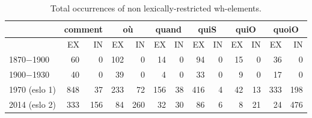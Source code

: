 \documentclass[fleqn,10pt]{wlscirep}
\begin{document}
\begin{table}[H]
    \centering
    \small
    \begin{adjustbox}{width=\textwidth}
        \begin{tabular}{l|rr|rr|rr|rr|rr|rr}
        {} & \multicolumn{2}{c}{comment}  & \multicolumn{2}{c}{où} & \multicolumn{2}{c}{quand}& \multicolumn{2}{c}{quiS} & \multicolumn{2}{c}{quiO}& \multicolumn{2}{c}{quoiO}\\
        \hline
        {} & EX & IN & EX & IN & EX & IN & EX & IN & EX & IN & EX & IN\\
        1870$-$1900 & 60 & 0 & 102 & 0 & 14 & 0 & 94 & 0 & 15 & 0 & 36 & 0\\
        1900$-$1930 & 40 & 0 & 39 & 0 & 4 & 0 & 33 & 0 & 9 & 0 & 17 & 0\\
        1970 (eslo 1) & 848 & 37 & 233 & 72 & 156 & 38 & 416 & 4 & 42 & 13 & 333 & 198\\
        2014 (eslo 2) & 333 & 156 & 84 & 260 & 32 & 30 & 86 & 6 & 8 & 21 & 24 & 476 \\
        \hline
        \end{tabular}
    \end{adjustbox}
\caption{\label{tab:samp3}Total occurrences of non lexically-restricted wh-elements.}
\end{table}
\end{document}
